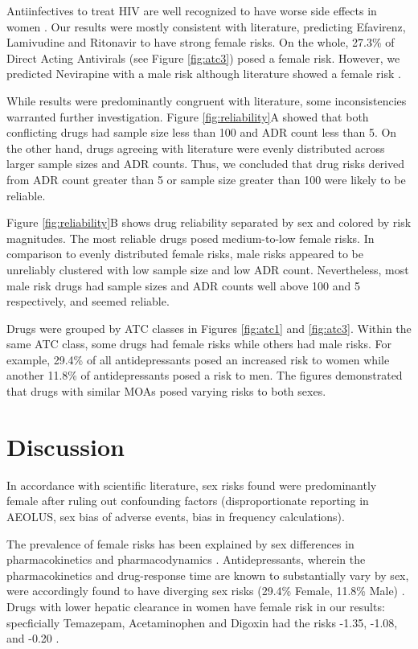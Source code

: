 \documentclass[11pt, oneside]{article}
\begin{document}
Antiinfectives to treat HIV are well recognized to have worse side effects in women \cite{ofotokun_sex_2003,whitley_sex-based_2009}. Our results were mostly consistent with literature, predicting Efavirenz, Lamivudine and Ritonavir to have strong female risks. On the whole, 27.3\% of Direct Acting Antivirals (see Figure \ref{fig:atc3}) posed a female risk. However, we predicted Nevirapine with a male risk although literature showed a female risk \cite{ofotokun_sex_2003,whitley_sex-based_2009}. 

While results were predominantly congruent with literature, some inconsistencies warranted further investigation. Figure \ref{fig:reliability}A showed that both conflicting drugs had sample size less than 100 and ADR count less than 5. On the other hand, drugs agreeing with literature were evenly distributed across larger sample sizes and ADR counts. Thus, we concluded that drug risks derived from ADR count greater than 5 or sample size greater than 100 were likely to be reliable. 

Figure \ref{fig:reliability}B shows drug reliability separated by sex and colored by risk magnitudes. The most reliable drugs posed medium-to-low female risks. In comparison to evenly distributed female risks, male risks appeared to be unreliably clustered with low sample size and low ADR count. Nevertheless, most male risk drugs had sample sizes and ADR counts well above 100 and 5 respectively, and seemed reliable.

Drugs were grouped by ATC classes in Figures \ref{fig:atc1} and \ref{fig:atc3}. Within the same ATC class, some drugs had female risks while others had male risks. For example, 29.4\% of all antidepressants posed an increased risk to women while another 11.8\% of antidepressants posed a risk to men. The figures demonstrated that drugs with similar MOAs posed varying risks to both sexes. 

\section{Discussion}

In accordance with scientific literature, sex risks found were predominantly female after ruling out confounding factors (disproportionate reporting in AEOLUS, sex bias of adverse events, bias in frequency calculations). 

The prevalence of female risks has been explained by sex differences in pharmacokinetics and pharmacodynamics \cite{rademaker_women_2001, tran_gender_1998,anderson_sex_2005, drici_is_2001}. Antidepressants, wherein the pharmacokinetics and drug-response time are known to substantially vary by sex, were accordingly found to have diverging sex risks (29.4\% Female, 11.8\% Male) \cite{bigos_sex_2009,rademaker_women_2001}. Drugs with lower hepatic clearance in women have female risk in our results: specficially Temazepam, Acetaminophen and Digoxin had the risks -1.35, -1.08, and -0.20 \cite{rademaker_women_2001,tharpe_adverse_2011}. 
\end{document}
